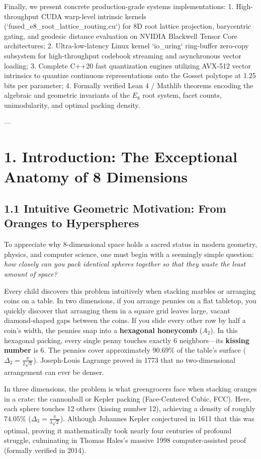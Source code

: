 \documentclass[11pt,twoside,openright]{amsbook}
\begin{document}
Finally, we present concrete production-grade systems implementations:
1. High-throughput CUDA warp-level intrinsic kernels (`fused_e8_root_lattice_routing.cu`) for 8D root lattice projection, barycentric gating, and geodesic distance evaluation on NVIDIA Blackwell Tensor Core architectures;
2. Ultra-low-latency Linux kernel `io_uring` ring-buffer zero-copy subsystem for high-throughput codebook streaming and asynchronous vector loading;
3. Complete C++20 fast quantization engines utilizing AVX-512 vector intrinsics to quantize continuous representations onto the Gosset polytope at 1.25 bits per parameter;
4. Formally verified Lean 4 / Mathlib theorems encoding the algebraic and geometric invariants of the $E_8$ root system, facet counts, unimodularity, and optimal packing density.

---

\section{1. Introduction: The Exceptional Anatomy of 8 Dimensions}

\subsection{1.1 Intuitive Geometric Motivation: From Oranges to Hyperspheres}

To appreciate why 8-dimensional space holds a sacred status in modern geometry, physics, and computer science, one must begin with a seemingly simple question: \textit{how closely can you pack identical spheres together so that they waste the least amount of space?}

Every child discovers this problem intuitively when stacking marbles or arranging coins on a table. In two dimensions, if you arrange pennies on a flat tabletop, you quickly discover that arranging them in a square grid leaves large, vacant diamond-shaped gaps between the coins. If you slide every other row by half a coin's width, the pennies snap into a \textbf{hexagonal honeycomb} ($A_2$). In this hexagonal packing, every single penny touches exactly 6 neighbors—its \textbf{kissing number} is 6. The pennies cover approximately $90.69\%$ of the table's surface ($\Delta_2 = \frac{\pi}{2\sqrt{3}}$). Joseph-Louis Lagrange proved in 1773 that no two-dimensional arrangement can ever be denser.

In three dimensions, the problem is what greengrocers face when stacking oranges in a crate: the cannonball or Kepler packing (Face-Centered Cubic, FCC). Here, each sphere touches 12 others (kissing number 12), achieving a density of roughly $74.05\%$ ($\Delta_3 = \frac{\pi}{3\sqrt{2}}$). Although Johannes Kepler conjectured in 1611 that this was optimal, proving it mathematically took nearly four centuries of profound struggle, culminating in Thomas Hales's massive 1998 computer-assisted proof (formally verified in 2014).
\end{document}
